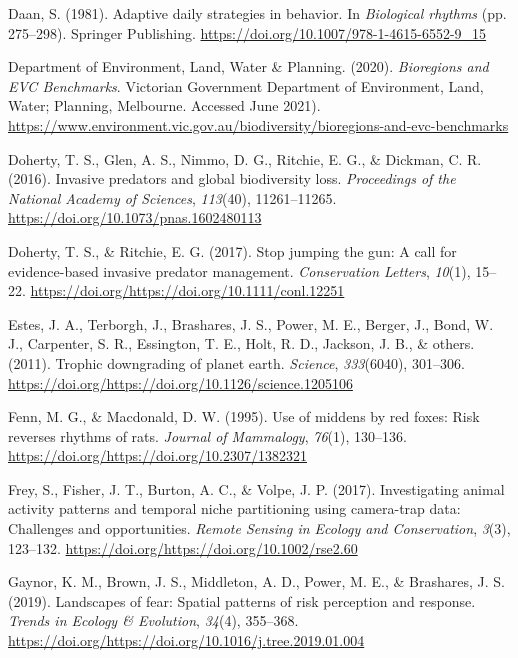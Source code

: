 \documentclass[]{elsarticle} %
\begin{document}
\leavevmode\hypertarget{ref-daan1981adaptive}{}%
Daan, S. (1981). Adaptive daily strategies in behavior. In \emph{Biological rhythms} (pp. 275--298). Springer Publishing. \url{https://doi.org/10.1007/978-1-4615-6552-9_15}

\leavevmode\hypertarget{ref-delwp2020bioregions}{}%
Department of Environment, Land, Water \& Planning. (2020). \emph{Bioregions and EVC Benchmarks}. Victorian Government Department of Environment, Land, Water; Planning, Melbourne. Accessed June 2021). \url{https://www.environment.vic.gov.au/biodiversity/bioregions-and-evc-benchmarks}

\leavevmode\hypertarget{ref-doherty2016invasive}{}%
Doherty, T. S., Glen, A. S., Nimmo, D. G., Ritchie, E. G., \& Dickman, C. R. (2016). Invasive predators and global biodiversity loss. \emph{Proceedings of the National Academy of Sciences}, \emph{113}(40), 11261--11265. \url{https://doi.org/10.1073/pnas.1602480113}

\leavevmode\hypertarget{ref-doherty2017stop}{}%
Doherty, T. S., \& Ritchie, E. G. (2017). Stop jumping the gun: A call for evidence-based invasive predator management. \emph{Conservation Letters}, \emph{10}(1), 15--22. \url{https://doi.org/https://doi.org/10.1111/conl.12251}

\leavevmode\hypertarget{ref-estes2011trophic}{}%
Estes, J. A., Terborgh, J., Brashares, J. S., Power, M. E., Berger, J., Bond, W. J., Carpenter, S. R., Essington, T. E., Holt, R. D., Jackson, J. B., \& others. (2011). Trophic downgrading of planet earth. \emph{Science}, \emph{333}(6040), 301--306. \url{https://doi.org/https://doi.org/10.1126/science.1205106}

\leavevmode\hypertarget{ref-fenn1995use}{}%
Fenn, M. G., \& Macdonald, D. W. (1995). Use of middens by red foxes: Risk reverses rhythms of rats. \emph{Journal of Mammalogy}, \emph{76}(1), 130--136. \url{https://doi.org/https://doi.org/10.2307/1382321}

\leavevmode\hypertarget{ref-frey2017investigating}{}%
Frey, S., Fisher, J. T., Burton, A. C., \& Volpe, J. P. (2017). Investigating animal activity patterns and temporal niche partitioning using camera-trap data: Challenges and opportunities. \emph{Remote Sensing in Ecology and Conservation}, \emph{3}(3), 123--132. \url{https://doi.org/https://doi.org/10.1002/rse2.60}

\leavevmode\hypertarget{ref-gaynor2019landscapes}{}%
Gaynor, K. M., Brown, J. S., Middleton, A. D., Power, M. E., \& Brashares, J. S. (2019). Landscapes of fear: Spatial patterns of risk perception and response. \emph{Trends in Ecology \& Evolution}, \emph{34}(4), 355--368. \url{https://doi.org/https://doi.org/10.1016/j.tree.2019.01.004}
\end{document}
